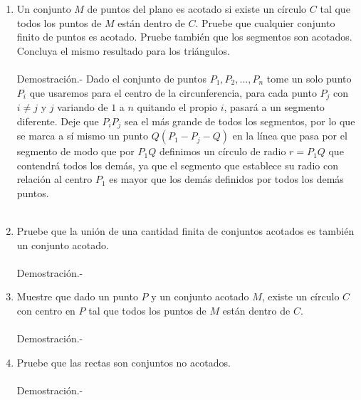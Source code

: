 \documentclass[10pt]{article}
\begin{document}
\begin{enumerate}
	\item Un conjunto $M$ de puntos del plano es acotado si existe un círculo $C$ tal que todos los puntos de $M$ están dentro de $C$. Pruebe que cualquier conjunto finito de puntos es acotado. Pruebe también que los segmentos son acotados. Concluya el mismo resultado para los triángulos.\\\\
	Demostración.-\; Dado el conjunto de puntos $P_1, P_2, ..., P_n$ tome un solo punto $P_i$ que usaremos para el centro de la circunferencia, para cada punto $P_j$ con $i\neq j$ y $j$ variando de $1$ a $n$ quitando el propio $i$, pasará a un segmento diferente. Deje que $P_i P_j$ sea el más grande de todos los segmentos, por lo que se marca a sí mismo un punto $Q (P_1 - P_j - Q)$ en la línea que pasa por el segmento de modo que por $P_1 Q$ definimos un círculo de radio $r = P_1 Q$ que contendrá todos los demás, ya que el segmento que establece su radio con relación al centro $P_1$ es mayor que los demás definidos por todos los demás puntos.\\\\

	\item Pruebe que la unión de una cantidad finita de conjuntos acotados es también un conjunto acotado.\\\\
	Demostración.-\;

	\item Muestre que dado un punto $P$ y un conjunto acotado $M$, existe un círculo $C$ con centro en $P$ tal que todos los puntos de $M$ están dentro de $C.$\\\\
	Demostración.-\;

	\item Pruebe que las rectas son conjuntos no acotados.\\\\
	Demostración.-\;



    \end{enumerate}
\end{document}

